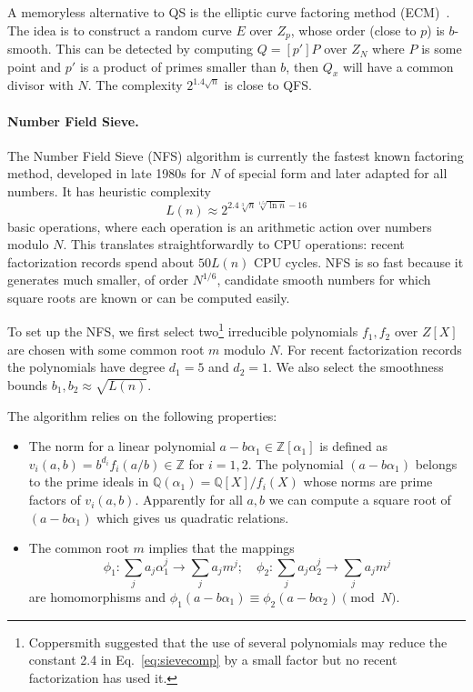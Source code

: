 \documentclass[a4paper]{article}
\begin{document}
A memoryless alternative to QS is the elliptic curve factoring method (ECM)~\cite{lenstra1987factoring}. The idea is to construct a random curve $E$ over $Z_p$, whose order (close to $p$) is $b$-smooth. This can be detected by computing $Q=[p']P$ over $Z_N$ where $P$ is some point and $p'$ is a product of primes smaller than $b$, then $Q_x$ will have a common divisor with $N$. The complexity $2^{1.4\sqrt{n}}$ is close to QFS.

\paragraph{Number Field Sieve.} The Number Field Sieve (NFS) algorithm is currently the fastest known factoring method, developed in late 1980s for $N$ of special form and later adapted for all numbers. It has heuristic complexity 
\begin{equation}\label{eq:sievecomp}
L(n) \approx 2^{2.4 \sqrt[3]{n}\sqrt[1.5]{\ln n}-16}
    \end{equation}
    basic operations, where each operation is an arithmetic action over numbers modulo $N$. This translates straightforwardly to CPU operations: recent factorization records spend about $50 L(n)$ CPU cycles. NFS is so fast because it generates much smaller, of order $N^{1/6}$, candidate smooth numbers for which square roots are known or can be computed easily.

To set up the NFS, we first select two\footnote{Coppersmith \cite{coppersmith1993modifications} suggested that the use of several polynomials may reduce the constant 2.4 in Eq.~\eqref{eq:sievecomp} by a small factor but no recent factorization has used it.} irreducible polynomials $f_1,f_2$ over $Z[X]$ are chosen with some common root $m$ modulo $N$. For recent factorization records  the polynomials have degree $d_1=5$ and $d_2=1$. We also select the smoothness bounds $b_1,b_2\approx \sqrt{L(n)}$.

The algorithm relies on the following properties:
\begin{itemize}
    \item The norm for a linear polynomial $a-b\alpha_1\in \mathbb{Z}[\alpha_1]$ is defined as $v_i(a,b) =  b^{d_i}f_i(a/b)\in \mathbb{Z}$ for $i=1,2$. The polynomial $(a-b\alpha_1)$ belongs to the prime ideals in $\mathbb{Q}(\alpha_1)=\mathbb{Q}[X]/f_i(X)$ whose norms are prime factors of $v_i(a,b)$.  Apparently  for all $a,b$ we can compute a square root of $(a-b\alpha_1)$ which gives us quadratic relations.
    \item The common root $m$ implies that the mappings $$
    \phi_1:\sum_j a_j \alpha_1^j\rightarrow\sum_j a_j m^j;\quad \phi_2:\sum_j a_j \alpha_2^j\rightarrow\sum_j a_j m^j
    $$
    are homomorphisms and $\phi_1(a-b\alpha_1) \equiv \phi_2(a-b\alpha_2) \pmod{N}$. 
\end{itemize}
\end{document}
